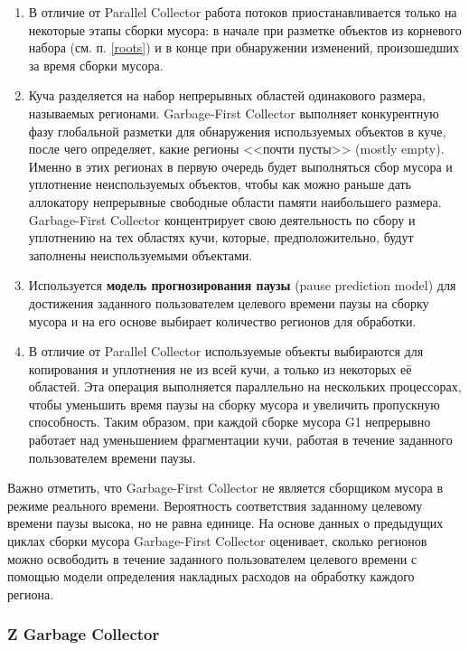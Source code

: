 \begin{enumerate}[label*=\arabic*.]
	\item В отличие от Parallel Collector работа потоков приостанавливается только на некоторые этапы сборки мусора: в начале при разметке объектов из корневого набора (см. п. \ref{roots}) и в конце при обнаружении изменений, произошедших за время сборки мусора. \cite{java_jrockit_memory} %
	\item Куча разделяется на набор непрерывных областей одинакового размера, называемых регионами. Garbage-First Collector выполняет конкурентную фазу глобальной разметки для обнаружения используемых объектов в куче, после чего определяет, какие регионы <<почти пусты>> (mostly empty). Именно в этих регионах в первую очередь будет выполняться сбор мусора и уплотнение неиспользуемых объектов, чтобы как можно раньше дать аллокатору непрерывные свободные области памяти наибольшего размера. Garbage-First Collector концентрирует свою деятельность по сбору и уплотнению на тех областях кучи, которые, предположительно, будут заполнены неиспользуемыми объектами. 
	\item Используется \textbf{модель прогнозирования паузы} (pause prediction model) для достижения заданного пользователем целевого времени паузы на сборку мусора и на его основе выбирает количество регионов для обработки.
	\item В отличие от Parallel Collector используемые объекты выбираются для копирования и уплотнения не из всей кучи, а только из некоторых её областей. Эта операция выполняется параллельно на нескольких процессорах, чтобы уменьшить время паузы на сборку мусора и увеличить пропускную способность. Таким образом, при каждой сборке мусора G1 непрерывно работает над уменьшением фрагментации кучи, работая в течение заданного пользователем времени паузы.
\end{enumerate}

Важно отметить, что Garbage-First Collector не является сборщиком мусора в режиме реального времени. Вероятность соответствия заданному целевому времени паузы высока, но не равна единице. На основе данных о предыдущих циклах сборки мусора Garbage-First Collector оценивает, сколько регионов можно освободить в течение заданного пользователем целевого времени с помощью модели определения накладных расходов на обработку каждого региона.~\cite{java_g1}


\subsubsection{Z Garbage Collector}

